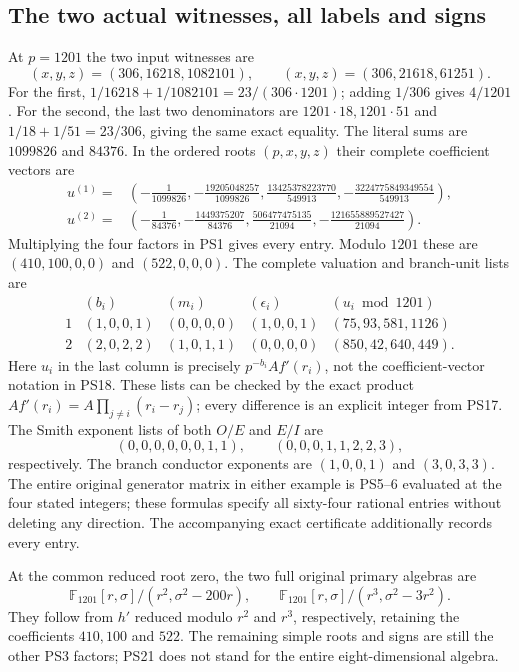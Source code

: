 \documentclass[11pt]{article}
\begin{document}
\subsection{The two actual witnesses, all labels and signs}
At $p=1201$ the two input witnesses are
\[
 (x,y,z)=(306,16218,1082101),\qquad
 (x,y,z)=(306,21618,61251).
 \tag{PS17}
\]
For the first,
$1/16218+1/1082101=23/(306\cdot1201)$; adding $1/306$
gives $4/1201$. For the second, the last two denominators are
$1201\cdot18,1201\cdot51$ and $1/18+1/51=23/306$, giving
the same exact equality. The literal sums are $1099826$ and $84376$.
In the ordered roots $(p,x,y,z)$ their complete coefficient vectors are
\[
 \begin{aligned}
 u^{(1)}={}&\left(
 -\frac1{1099826},-\frac{19205048257}{1099826},
 \frac{13425378223770}{549913},
 -\frac{3224775849349554}{549913}\right),\\
 u^{(2)}={}&\left(
 -\frac1{84376},-\frac{1449375207}{84376},
 \frac{506477475135}{21094},
 -\frac{121655889527427}{21094}\right).
 \end{aligned}\tag{PS18}
\]
Multiplying the four factors in PS1 gives every entry.
Modulo $1201$ these are $(410,100,0,0)$ and $(522,0,0,0)$.
The complete valuation and branch-unit lists are
\[
 \begin{array}{c|c|c|c|c}
 & (b_i)&(m_i)&(\epsilon_i)&(u_i\bmod1201)\\ \hline
 1&(1,0,0,1)&(0,0,0,0)&(1,0,0,1)&(75,93,581,1126)\\
 2&(2,0,2,2)&(1,0,1,1)&(0,0,0,0)&(850,42,640,449).
 \end{array}\tag{PS19}
\]
Here $u_i$ in the last column is precisely $p^{-b_i}Af'(r_i)$,
not the coefficient-vector notation in PS18.
These lists can be checked by the exact product
$Af'(r_i)=A\prod_{j\ne i}(r_i-r_j)$; every difference is an explicit
integer from PS17. The Smith exponent lists of both $O/E$ and $E/I$ are
\[
 (0,0,0,0,0,0,1,1),\qquad
 (0,0,0,1,1,2,2,3),
 \tag{PS20}
\]
respectively. The branch conductor exponents are $(1,0,0,1)$ and
$(3,0,3,3)$. The entire original generator matrix in either example
is PS5--6 evaluated at the four stated integers; these formulas
specify all sixty-four rational entries without deleting any direction.
The accompanying exact certificate additionally records every entry.

At the common reduced root zero, the two full original primary algebras are
\[
 \mathbb F_{1201}[r,\sigma]/(r^2,\sigma^2-200r),\qquad
 \mathbb F_{1201}[r,\sigma]/(r^3,\sigma^2-3r^2).
 \tag{PS21}
\]
They follow from $h'$ reduced modulo $r^2$ and $r^3$,
respectively, retaining the coefficients $410,100$ and $522$.
The remaining simple roots and signs are still the other PS3 factors;
PS21 does not stand for the entire eight-dimensional algebra.
\end{document}
